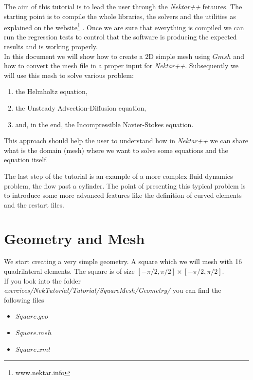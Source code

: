 \documentclass[12pt]{article}
\begin{document}
\maketitle

\noindent
The aim of this tutorial is to lead the user through the \emph{Nektar++} fetaures. The starting point is to compile the whole libraries, the solvers and the utilities
as explained on the website\footnote{www.nektar.info} . Once we are sure that everything is compiled we can run the regression tests to control that the software is producing the expected results and is working properly.\\

\noindent
In this document we will show how to create a 2D simple mesh using $Gmsh$ and how to convert the mesh file in a proper input for \emph{Nektar++}.
Subsequently we will use this mesh to solve various problem:
\begin{enumerate}
\item the Helmholtz equation,
\item the Unsteady Advection-Diffusion equation,
\item and, in the end, the Incompressible Navier-Stokes equation. 
\end{enumerate}

\noindent
This approach should help the user to understand how in \emph{Nektar++}  we can share what is the domain (mesh) where we want to solve some equations and
the equation itself.

\noindent
The last step of the tutorial is an example of a more complex fluid dynamics problem, the flow past a cylinder. The point of presenting this typical problem is to introduce some
more advanced features like the definition of curved elements and the restart files. 

\section{Geometry and Mesh}

We start creating a very simple geometry. A square which we will mesh with 16 quadrilateral elements.
The square is of size $[-\pi/2,\pi/2]\times[-\pi/2,\pi/2]$.\\

\noindent
If you look into the folder \emph{exercices/NekTutorial/Tutorial/SquareMesh/Geometry/}  you can find the following files
\begin{itemize}
\item $Square.geo$
\item $Square.msh$
\item $Square.xml$\\
\end{itemize}
\end{document}
